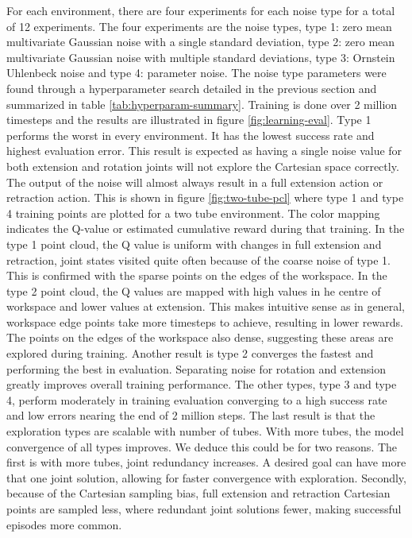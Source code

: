 For each environment, there are four experiments for each noise type for a total of 12 experiments. The four experiments are the noise types, type 1: zero mean multivariate Gaussian noise with a single standard deviation, type 2: zero mean multivariate Gaussian noise with multiple standard deviations, type 3: Ornstein Uhlenbeck noise and type 4: parameter noise. The noise type parameters were found through a hyperparameter search detailed in the previous section and summarized in table \ref{tab:hyperparam-summary}. Training is done over 2 million timesteps and the results are illustrated in figure \ref{fig:learning-eval}. Type 1 performs the worst in every environment. It has the lowest success rate and highest evaluation error. This result is expected as having a single noise value for both extension and rotation joints will not explore the Cartesian space correctly. The output of the noise will almost always result in a full extension action or retraction action. This is shown in figure \ref{fig:two-tube-pcl} where type 1 and type 4 training points are plotted for a two tube environment. The color mapping indicates the Q-value or estimated cumulative reward during that training. In the type 1 point cloud, the Q value is uniform with changes in full extension and retraction, joint states visited quite often because of the coarse noise of type 1. This is confirmed with the sparse points on the edges of the workspace. In the type 2 point cloud, the Q values are mapped with high values in he centre of workspace and lower values at extension. This makes intuitive sense as in general, workspace edge points take more timesteps to achieve, resulting in lower rewards. The points on the edges of the workspace also dense, suggesting these areas are explored during training. Another result is type 2 converges the fastest and performing the best in evaluation. Separating noise for rotation and extension greatly improves overall training performance. The other types, type 3 and type 4, perform moderately in training evaluation converging to a high success rate and low errors nearing the end of 2 million steps. The last result is that the exploration types are scalable with number of tubes. With more tubes, the model convergence of all types improves. We deduce this could be for two reasons. The first is with more tubes, joint redundancy increases. A desired goal can have more that one joint solution, allowing for faster convergence with exploration. Secondly, because of the Cartesian sampling bias, full extension and retraction Cartesian points are sampled less, where redundant joint solutions fewer, making successful episodes more common.
